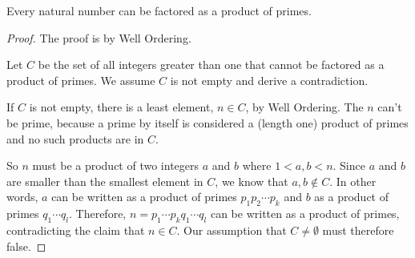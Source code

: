 \begin{theorem}
Every natural number can be factored as a product of primes.
\end{theorem}
\begin{proof}
The proof is by Well Ordering.

Let $C$ be the set of all integers greater than one that cannot be
factored as a product of primes.  We assume $C$ is not empty and derive a
contradiction.

If $C$ is not empty, there is a least element, $n \in C$, by Well
Ordering.  The $n$ can't be prime, because a prime by itself is considered
a (length one) product of primes and no such products are in $C$.

So $n$ must be a product of two integers $a$ and $b$ where $1<a,b<n$.
Since $a$ and $b$ are smaller than the smallest element in $C$, we know
that $a,b \notin C$.  In other words, $a$ can be written as a product of
primes $p_1p_2\cdots p_k$ and $b$ as a product of primes $q_1\cdots q_l$.
Therefore, $n=p_1\cdots p_k q_1 \cdots q_l$ can be written as a product of
primes, contradicting the claim that $n \in C$.  Our assumption that $C
\neq \emptyset$ must therefore false.
\end{proof}

\iffalse

Here's a fallacious argument: every number can be factored uniquely
into primes.  Apply the same proof as before, adding ``uniquely'' to
the inductive hypothesis.  The problem is that even if $n=ab$ and
$a,b$ have unique factorizations, it is still possible that $n=cd$ for
different $c$ and $d$, producing a different factorization of $n$.

The argument is false, but the claim is true and is known as the
fundamental theorem of arithmetic.
\fi


\iffalse
Mathematicians commonly use the Well Ordering Principle because it can
lead to shorter proofs than induction.  On the other hand, well ordering
proofs typically involve proof by contradiction, so using it is not always
the best approach.  The choice of method is really a matter of style---but
style does matter.
\fi


\endinput
